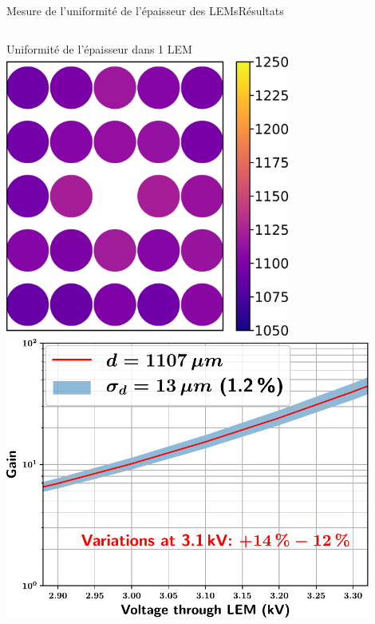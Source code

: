 \begin{frame}{Mesure de l'uniformité de l'épaisseur des LEMs}{Résultats}
\begin{scriptsize}
\begin{columns}
\begin{column}{0.48\textwidth}
    				\centering
    				Uniformité de l'épaisseur dans 1 LEM\\
    				\centering
    				\includegraphics[width=0.7\textwidth]{./pictures/2D_LEM_thickness_distri.png}\\
    				\vspace{0.15cm}
    				\centering
    				\includegraphics[width=0.9\textwidth]{./pictures/measured_gain_fluctuations.pdf}
    			\end{column}
    		\end{columns}
    	\end{scriptsize}
    \end{frame}


